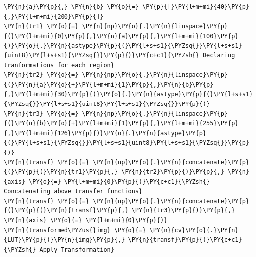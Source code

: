 \documentclass[a4paper,10pt]{article}%
\begin{document}
    \begin{tcolorbox}[breakable, size=fbox, boxrule=1pt, pad at break*=1mm,colback=cellbackground, colframe=cellborder]
\begin{Verbatim}[commandchars=\\\{\}]
\PY{n}{a}\PY{p}{,} \PY{n}{b} \PY{o}{=} \PY{p}{[}\PY{l+m+mi}{40}\PY{p}{,}\PY{l+m+mi}{200}\PY{p}{]}
\PY{n}{tr1} \PY{o}{=} \PY{n}{np}\PY{o}{.}\PY{n}{linspace}\PY{p}{(}\PY{l+m+mi}{0}\PY{p}{,}\PY{n}{a}\PY{p}{,}\PY{l+m+mi}{100}\PY{p}{)}\PY{o}{.}\PY{n}{astype}\PY{p}{(}\PY{l+s+s1}{\PYZsq{}}\PY{l+s+s1}{uint8}\PY{l+s+s1}{\PYZsq{}}\PY{p}{)}\PY{c+c1}{\PYZsh{} Declaring tranformations for each region}
\PY{n}{tr2} \PY{o}{=} \PY{n}{np}\PY{o}{.}\PY{n}{linspace}\PY{p}{(}\PY{n}{a}\PY{o}{+}\PY{l+m+mi}{1}\PY{p}{,}\PY{n}{b}\PY{p}{,}\PY{l+m+mi}{30}\PY{p}{)}\PY{o}{.}\PY{n}{astype}\PY{p}{(}\PY{l+s+s1}{\PYZsq{}}\PY{l+s+s1}{uint8}\PY{l+s+s1}{\PYZsq{}}\PY{p}{)}
\PY{n}{tr3} \PY{o}{=} \PY{n}{np}\PY{o}{.}\PY{n}{linspace}\PY{p}{(}\PY{n}{b}\PY{o}{+}\PY{l+m+mi}{1}\PY{p}{,}\PY{l+m+mi}{255}\PY{p}{,}\PY{l+m+mi}{126}\PY{p}{)}\PY{o}{.}\PY{n}{astype}\PY{p}{(}\PY{l+s+s1}{\PYZsq{}}\PY{l+s+s1}{uint8}\PY{l+s+s1}{\PYZsq{}}\PY{p}{)}
\PY{n}{transf} \PY{o}{=} \PY{n}{np}\PY{o}{.}\PY{n}{concatenate}\PY{p}{(}\PY{p}{(}\PY{n}{tr1}\PY{p}{,} \PY{n}{tr2}\PY{p}{)}\PY{p}{,} \PY{n}{axis} \PY{o}{=} \PY{l+m+mi}{0}\PY{p}{)}\PY{c+c1}{\PYZsh{} Concatenating above transfer functions}
\PY{n}{transf} \PY{o}{=} \PY{n}{np}\PY{o}{.}\PY{n}{concatenate}\PY{p}{(}\PY{p}{(}\PY{n}{transf}\PY{p}{,} \PY{n}{tr3}\PY{p}{)}\PY{p}{,} \PY{n}{axis} \PY{o}{=} \PY{l+m+mi}{0}\PY{p}{)}
\PY{n}{transformed\PYZus{}img} \PY{o}{=} \PY{n}{cv}\PY{o}{.}\PY{n}{LUT}\PY{p}{(}\PY{n}{img}\PY{p}{,} \PY{n}{transf}\PY{p}{)}\PY{c+c1}{\PYZsh{} Apply Transformation}
\end{Verbatim}
\end{tcolorbox}
\end{document}
